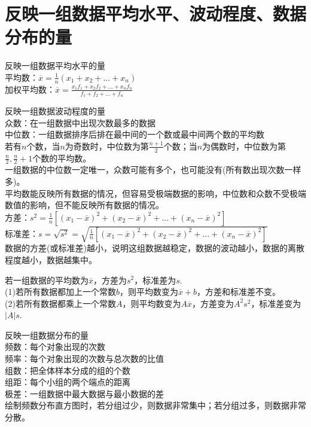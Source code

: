 \section{反映一组数据平均水平、波动程度、数据分布的量}
\begin{theorem}
    反映一组数据平均水平的量 \\
    平均数：$\overline x = \frac{1}{n}(x_1+x_2+...+x_n)$ \\
    加权平均数：$\overline x=\frac{x_1f_1+x_2f_2+...+x_nf_n}{f_1+f_2+...+f_n}$
\end{theorem}
\begin{theorem}
    反映一组数据波动程度的量 \\
    众数：在一组数据中出现次数最多的数据 \\
    中位数：一组数据排序后排在最中间的一个数或最中间两个数的平均数 \\
    若有$n$个数，当$n$为奇数时，中位数为第$\frac{n+1}{2}$个数；当$n$为偶数时，中位数为第$\frac{n}{2},\frac{n}{2}+1$个数的平均数。\\
    一组数据的中位数一定唯一，众数可能有多个，也可能没有(所有数出现次数一样多)。\\
    平均数能反映所有数据的情况，但容易受极端数据的影响，中位数和众数不受极端数值的影响，但不能反映所有数据的情况。\\
    方差：$s^2=\frac{1}{n}[(x_1-\overline x)^2+(x_2-\overline x)^2+...+(x_n-\overline x)^2]$ \\
    标准差：$s=\sqrt{s^2}=\sqrt{\frac{1}{n}[(x_1-\overline x)^2+(x_2-\overline x)^2+...+(x_n-\overline x)^2]}$ \\
    数据的方差(或标准差)越小，说明这组数据越稳定，数据的波动越小，数据的离散程度越小，数据越集中。
\end{theorem}
\begin{theorem}
    若一组数据的平均数为$\overline x$，方差为$s^2$，标准差为$s$. \\
    (1)若所有数据都加上一个常数$b$，则平均数变为$\overline x+b$，方差和标准差不变。 \\
    (2)若所有数据都乘上一个常数$A$，则平均数变为$A\overline x$，方差变为$A^2s^2$，标准差变为$|A|s$.
\end{theorem}
\begin{theorem}
    反映一组数据分布的量 \\
    频数：每个对象出现的次数 \\
    频率：每个对象出现的次数与总次数的比值  \\
    组数：把全体样本分成的组的个数 \\
    组距：每个小组的两个端点的距离 \\
    极差：一组数据中最大数据与最小数据的差 \\
    绘制频数分布直方图时，若分组过少，则数据非常集中；若分组过多，则数据非常分散。
\end{theorem}
